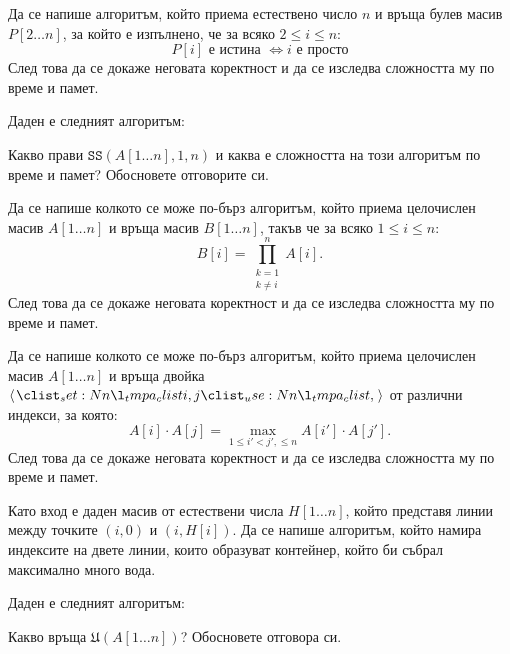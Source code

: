 \begin{problem}
Да се напише алгоритъм, който приема естествено число $n$ и връща булев масив $P[2 \dots n]$, за който е изпълнено, че за всяко $2 \leq i \leq n$:
\[
    P[i] \text{ е истина } \iff i \text{ е просто}
\]
След това да се докаже неговата коректност и да се изследва сложността му по време и памет.
\end{problem}

\begin{problem}
Даден е следният алгоритъм:

Какво прави $\mathtt{SS}(A[1 \dots n], 1, n)$ и каква е сложността на този алгоритъм по време и памет?
Обосновете отговорите си.
\end{problem}

\begin{problem}
Да се напише колкото се може по-бърз алгоритъм, който приема целочислен масив $A[1 \dots n]$ и връща масив $B[1 \dots n]$, такъв че за всяко $1 \leq i \leq n$:
\[
    B[i] = \prod\limits_{\substack{k = 1 \\ k \neq i}}^n A[i].
\]
След това да се докаже неговата коректност и да се изследва сложността му по време и памет.
\end{problem}

\begin{problem}
Да се напише колкото се може по-бърз алгоритъм, който приема целочислен масив $A[1 \dots n]$ и връща двойка $\opair{i, j}$ от различни индекси, за която:
\[
    A[i] \cdot A[j] = \max\limits_{1 \leq i' < j', \leq n} A[i'] \cdot A[j'].
\]
След това да се докаже неговата коректност и да се изследва сложността му по време и памет.
\end{problem}

\begin{problem}
Като вход е даден масив от естествени числа $H[1 \dots n]$, който представя линии между точките $(i, 0)$ и $(i, H[i])$.
Да се напише алгоритъм, който намира индексите на двете линии, които образуват контейнер, който би събрал максимално много вода.
\end{problem}

\newpage

\begin{problem}
Даден е следният алгоритъм:

Какво връща $\mathfrak{U}(A[1 \dots n])$?
Обосновете отговора си.
\end{problem}